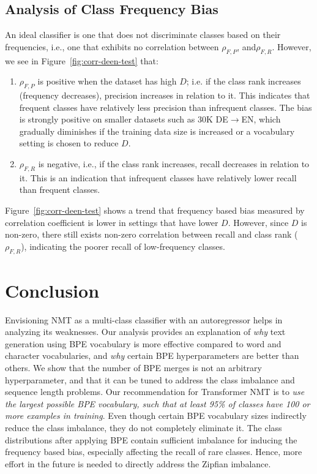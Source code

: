 \subsection{Analysis of Class Frequency Bias}
An ideal classifier is one that does not discriminate classes based on their frequencies, i.e., one that exhibits no correlation between $\rho_{F, P}$, and$\rho_{F, R}$.  
However, we see in Figure~\ref{fig:corr-deen-test} that:
\begin{enumerate}
    \itemsep0em
    \item $\rho_{F, P}$ is positive when the dataset has high $D$; i.e. if the class rank increases (frequency decreases), precision increases in relation to it.
    This indicates that frequent classes have relatively less precision than infrequent classes.
    The bias is strongly positive on smaller datasets such as 30K DE$\rightarrow$EN, which gradually diminishes if the training data size is increased or a vocabulary setting is chosen to reduce $D$.
    \item $\rho_{F, R}$ is negative, i.e., if the class rank increases, recall decreases in relation to it. 
    This is an indication that infrequent classes have relatively lower recall than frequent classes.
\end{enumerate}
Figure~\ref{fig:corr-deen-test} shows a trend that frequency based bias measured by correlation coefficient is lower in settings that have lower $D$.
However, since $D$ is non-zero, there still exists non-zero correlation between recall and class rank ($\rho_{F, R}$), indicating the poorer recall of low-frequency classes.

\section{Conclusion}
\label{sec:conclusion}
Envisioning NMT as a multi-class classifier with an autoregressor helps in analyzing its weaknesses.
Our analysis provides an explanation of \textit{why} text generation using BPE vocabulary is more effective compared to word and character vocabularies, and \textit{why} certain BPE hyperparameters are better than others.
We show that the number of BPE merges is not an arbitrary hyperparameter, and that it can be tuned to address the class imbalance and sequence length problems. 
Our recommendation for Transformer NMT is to \textit{use the largest possible BPE vocabulary, such that at least 95\% of classes have 100 or more examples in training}.
Even though certain BPE vocabulary sizes indirectly reduce the class imbalance, they do not completely eliminate it.
The class distributions after applying BPE contain sufficient imbalance for inducing the frequency based bias, especially affecting the recall of rare classes. 
Hence, more effort in the future is needed to directly address the Zipfian imbalance.

